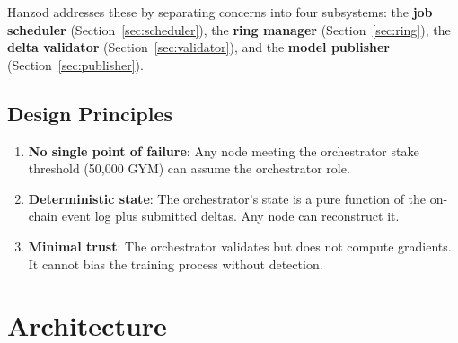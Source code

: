 \documentclass[11pt,letterpaper]{article}
\begin{document}
Hanzod addresses these by separating concerns into four subsystems: the \textbf{job scheduler} (Section~\ref{sec:scheduler}), the \textbf{ring manager} (Section~\ref{sec:ring}), the \textbf{delta validator} (Section~\ref{sec:validator}), and the \textbf{model publisher} (Section~\ref{sec:publisher}).

\subsection{Design Principles}

\begin{enumerate}
    \item \textbf{No single point of failure}: Any node meeting the orchestrator stake threshold (50{,}000 GYM) can assume the orchestrator role.
    \item \textbf{Deterministic state}: The orchestrator's state is a pure function of the on-chain event log plus submitted deltas.  Any node can reconstruct it.
    \item \textbf{Minimal trust}: The orchestrator validates but does not compute gradients.  It cannot bias the training process without detection.
\end{enumerate}

\section{Architecture}
\label{sec:architecture}
\end{document}
